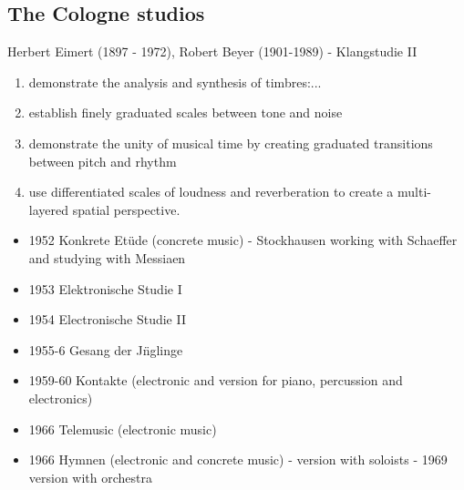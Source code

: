 \subsection{The Cologne studios}

Herbert Eimert (1897 - 1972), Robert Beyer (1901-1989) - Klangstudie II

\begin{enumerate}
\item demonstrate the analysis and synthesis of timbres:...
\item establish finely graduated scales between tone and noise
\item demonstrate the unity of musical time by creating graduated transitions between pitch and rhythm
\item use differentiated scales of loudness and reverberation to create a multi-layered spatial perspective.
\end{enumerate}

\begin{itemize}
\item 1952 Konkrete Et\"ude (concrete music) - Stockhausen working with Schaeffer and studying with Messiaen
\item 1953 Elektronische Studie I
\item 1954 Electronische Studie II
\item 1955-6 Gesang der J\"nglinge
\item 1959-60 Kontakte (electronic and version for piano, percussion and electronics)
\item 1966 Telemusic (electronic music)
\item 1966 Hymnen (electronic and concrete music) - version with soloists - 1969 version with orchestra
\end{itemize}

